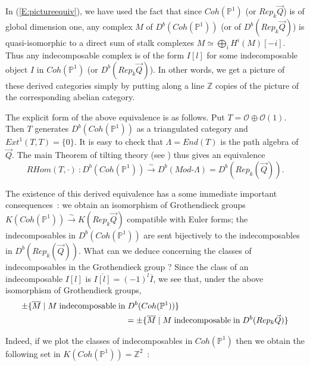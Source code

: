 \documentclass[a4paper,10pt]{amsart}
\def\Z{\mathbb{Z}}
\def\O{\mathcal{O}}
\numberwithin{equation}{section}
\begin{document}
{\vspace{.5in}

In (\ref{E:pictureequiv}), we have used the fact that since $Coh(\mathbb{P}^1)$ (or $Rep_k\vec{Q}$) is of global dimension one, any complex $M$ of $D^b(Coh(\mathbb{P}^1))$ (or of $D^b(Rep_k\vec{Q})$) is quasi-isomorphic to a direct sum of stalk complexes $M \simeq \bigoplus_i H^i(M)[-i]$. Thus any indecomposable complex is of the form $I[l]$ for some indecomposable object $I$ in $Coh(\mathbb{P}^1)$ (or $D^b(Rep_k\vec{Q})$). In other words, we get a picture of these derived categories simply by putting along a line $\Z$ copies of the picture of the corresponding abelian category.

\vspace{.1in}

The explicit form of the above equivalence is as follows. Put $T=\O\oplus \O(1)$. Then $T$ generates $D^b(Coh(\mathbb{P}^1))$ as a triangulated category and ${Ext}^1(T,T)=\{0\}$. It is easy to check that $\Lambda={End}(T)$ is the path algebra of $\vec{Q}$.
 The main Theorem of tilting theory (see \cite{Happelbook}) thus gives an equivalence
$$RHom(T,\cdot)~: D^b(Coh(\mathbb{P}^1)) \stackrel{\sim}{\to} D^b({Mod}\text{-}\Lambda) = D^b(Rep_k(\vec{Q})).$$

\vspace{.1in}

The existence of this derived equivalence has a some immediate important consequences~: we obtain an isomorphism of Grothendieck groups $K(Coh(\mathbb{P}^1)) \stackrel{\sim}{\to} K(Rep_k\vec{Q})$ compatible with Euler forms; the indecomposables in $D^b(Coh(\mathbb{P}^1))$ are sent bijectively to the indecomposables in $D^b(Rep_k(\vec{Q}))$. What can we deduce concerning the classes of indecomposables in the Grothendieck group ? Since the class of an indecomposable $I[l]$ is $\overline{I[l]}=(-1)^l\overline{I}$, we see that, under the above isomorphism of Grothendieck groups,
\begin{equation*}
\begin{split}
\pm \{ \overline{M}\;|\; M \;\text{indecomposable\;in}& \; D^b(Coh(\mathbb{P}^1))\}\\
&=\pm \{ \overline{M}\;|\; M \;\text{indecomposable\;in} \; D^b(Rep_k\vec{Q})\}
\end{split}
\end{equation*}

Indeed, if we plot the classes of indecomposables in $Coh(\mathbb{P}^1)$ then we obtain the following set in $K(Coh(\mathbb{P}^1))=\Z^2$~:

}
\end{document}
